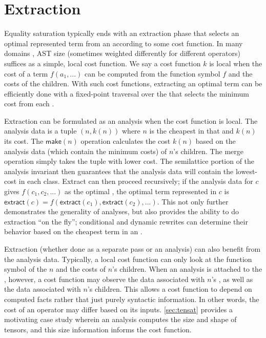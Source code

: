 \section{Extraction}
\label{sec:tricks-extraction}

Equality saturation typically ends with an extraction phase that selects an
  optimal represented term from an \eclass according to some cost function.
In many domains \cite{herbie, szalinski}, AST size
  (sometimes weighted differently for different operators) suffices as a simple,
  local cost function.
We say a cost function $k$ is local when the cost of a term $f(a_{1}, ...)$ can be
  computed from the function symbol $f$ and the costs of the children.
With such cost functions, extracting an optimal term can be efficiently done
  with a fixed-point traversal over the \egraph that selects the minimum cost
  \enode from each \eclass \cite{herbie}.

Extraction can be formulated as an \eclass analysis when the cost function
  is local.
The analysis data is a tuple $(n, k(n))$ where $n$ is the cheapest \enode
  in that \eclass and $k(n)$ its cost.
The $\textsf{make}(n)$ operation calculates the cost $k(n)$ based on
  the analysis data (which contain the minimum costs) of $n$'s children.
The \textsf{merge} operation simply takes the tuple with lower cost.
The semilattice portion of the analysis invariant then guarantees that the
  analysis data will contain the lowest-cost \enode in each class.
Extract can then proceed recursively;
  if the analysis data for \eclass $c$ gives $f(c_{1}, c_{2}, ...)$ as the optimal \enode,
  the optimal term represented in $c$ is
  $\textsf{extract}(c) = f( \textsf{extract}(c_{1}), \textsf{extract}(c_{2}), ... )$.
This not only further demonstrates the generality of \eclass analyses, but also
  provides the ability to do extraction ``on the fly''; conditional and dynamic
  rewrites can determine their behavior based on the cheapest term in an \eclass.

Extraction (whether done as a separate pass or an \eclass analysis) can also
  benefit from the analysis data.
Typically, a local cost function can only look at the function symbol of the
  \enode $n$ and the costs of $n$'s children.
When an \eclass analysis is attached to the \egraph, however, a cost function
  may observe the data associated with $n$'s \eclass, as well as the data
  associated with $n$'s children.
This allows a cost function to depend on computed facts rather that just purely
  syntactic information.
In other words, the cost of an operator may differ based on its inputs.
\autoref{sec:tensat} provides a motivating case study wherein an \eclass
  analysis computes the size and shape of tensors, and this size information
  informs the cost function.

